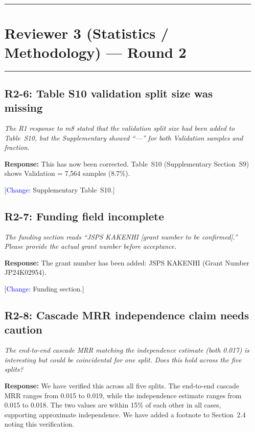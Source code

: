 \documentclass[11pt,a4paper]{article}
\newcommand{\reviewercomment}[1]{\textit{\color{black!70}#1}}
\newcommand{\response}[1]{\textbf{Response:} #1}
\newcommand{\change}[1]{[\textcolor{blue}{Change:} #1]}
\begin{document}
\vspace{1em}
\noindent\rule{\linewidth}{0.8pt}

\section*{Reviewer 3 (Statistics / Methodology) --- Round 2}
\noindent\rule{\linewidth}{0.4pt}

\subsection*{R2-6: Table S10 validation split size was missing}

\reviewercomment{The R1 response to m8 stated that the validation split size
had been added to Table~S10, but the Supplementary showed ``---'' for both
Validation samples and fraction.}

\response{This has now been corrected. Table~S10 (Supplementary Section~S9)
shows Validation = 7,564 samples (8.7\%).}

\change{Supplementary Table~S10.}

\subsection*{R2-7: Funding field incomplete}

\reviewercomment{The funding section reads ``JSPS KAKENHI [grant number to be
confirmed].'' Please provide the actual grant number before acceptance.}

\response{The grant number has been added: JSPS KAKENHI (Grant Number
JP24K02954).}

\change{Funding section.}

\subsection*{R2-8: Cascade MRR independence claim needs caution}

\reviewercomment{The end-to-end cascade MRR matching the independence estimate
(both 0.017) is interesting but could be coincidental for one split. Does this
hold across the five splits?}

\response{We have verified this across all five splits. The end-to-end cascade
MRR ranges from 0.015 to 0.019, while the independence estimate ranges from
0.015 to 0.018. The two values are within 15\% of each other in all cases,
supporting approximate independence. We have added a footnote to Section~2.4
noting this verification.}
\end{document}
